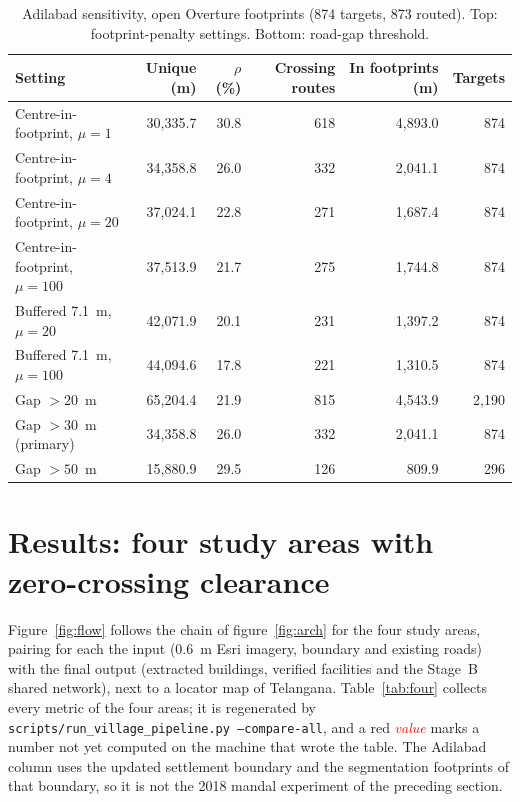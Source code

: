 \documentclass[12pt,a4paper]{article}
\newcommand{\pending}[1]{\textcolor{red}{\textit{#1}}}%
\begin{document}
\begin{table}[t]
\caption{Adilabad sensitivity, open Overture footprints (874 targets, 873 routed). Top: footprint-penalty settings. Bottom: road-gap threshold.}
\label{tab:sens_open}
\centering
\footnotesize
\begin{tabular}{@{}lrrrrr@{}}
\toprule
Setting & Unique (m) & $\rho$ (\%) & Crossing routes & In footprints (m) & Targets\\
\midrule
Centre-in-footprint, $\mu=1$ & 30{,}335.7 & 30.8 & 618 & 4{,}893.0 & 874\\
Centre-in-footprint, $\mu=4$ & 34{,}358.8 & 26.0 & 332 & 2{,}041.1 & 874\\
Centre-in-footprint, $\mu=20$ & 37{,}024.1 & 22.8 & 271 & 1{,}687.4 & 874\\
Centre-in-footprint, $\mu=100$ & 37{,}513.9 & 21.7 & 275 & 1{,}744.8 & 874\\
Buffered 7.1~m, $\mu=20$ & 42{,}071.9 & 20.1 & 231 & 1{,}397.2 & 874\\
Buffered 7.1~m, $\mu=100$ & 44{,}094.6 & 17.8 & 221 & 1{,}310.5 & 874\\
\midrule
Gap $>20$~m & 65{,}204.4 & 21.9 & 815 & 4{,}543.9 & 2{,}190\\
Gap $>30$~m (primary) & 34{,}358.8 & 26.0 & 332 & 2{,}041.1 & 874\\
Gap $>50$~m & 15{,}880.9 & 29.5 & 126 & 809.9 & 296\\
\bottomrule
\end{tabular}
\end{table}

\section{Results: four study areas with zero-crossing clearance}\label{sec:four}
Figure~\ref{fig:flow} follows the chain of figure~\ref{fig:arch} for the four study areas, pairing for each the input (0.6~m Esri imagery, boundary and existing roads) with the final output (extracted buildings, verified facilities and the Stage~B shared network), next to a locator map of Telangana. Table~\ref{tab:four} collects every metric of the four areas; it is regenerated by \texttt{scripts/run\_village\_pipeline.py --compare-all}, and a red \pending{value} marks a number not yet computed on the machine that wrote the table. The Adilabad column uses the updated settlement boundary and the segmentation footprints of that boundary, so it is not the 2018 mandal experiment of the preceding section.
\end{document}
